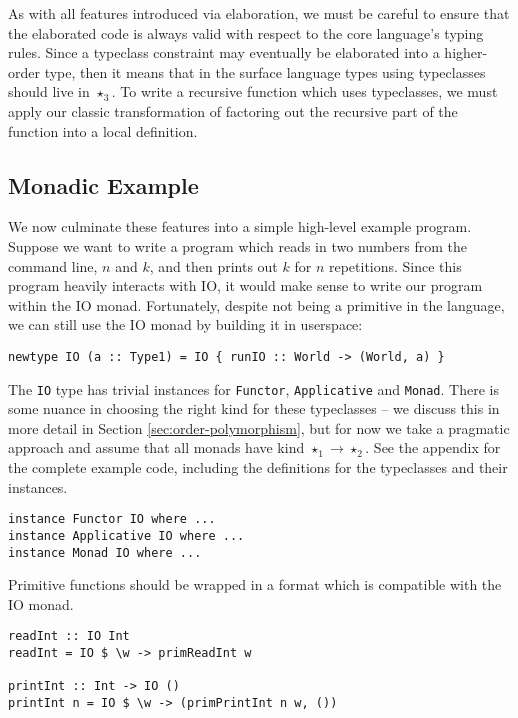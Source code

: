 \documentclass[runningheads]{llncs}
\begin{document}
As with all features introduced via elaboration, we must be careful to ensure that the elaborated code is always valid with respect to the core language's typing rules. Since a typeclass constraint may eventually be elaborated into a higher-order type, then it means that in the surface language types using typeclasses should live in $\star_3$. To write a recursive function which uses typeclasses, we must apply our classic transformation of factoring out the recursive part of the function into a local definition.



\subsection{Monadic Example} \label{sec:example}

We now culminate these features into a simple high-level example program. Suppose we want to write a program which reads in two numbers from the command line, $n$ and $k$, and then prints out $k$ for $n$ repetitions. Since this program heavily interacts with IO, it would make sense to write our program within the IO monad. Fortunately, despite not being a primitive in the language, we can still use the IO monad by building it in userspace:

\begin{verbatim}
newtype IO (a :: Type1) = IO { runIO :: World -> (World, a) }
\end{verbatim}

The \texttt{IO} type has trivial instances for \texttt{Functor}, \texttt{Applicative} and \texttt{Monad}. There is some nuance in choosing the right kind for these typeclasses -- we discuss this in more detail in Section \ref{sec:order-polymorphism}, but for now we take a pragmatic approach and assume that all monads have kind $\star_1 \rightarrow \star_2$. See the appendix for the complete example code, including the definitions for the typeclasses and their instances.

\begin{verbatim}
instance Functor IO where ...
instance Applicative IO where ...
instance Monad IO where ...
\end{verbatim}

Primitive functions should be wrapped in a format which is compatible with the IO monad.

\begin{verbatim}
readInt :: IO Int
readInt = IO $ \w -> primReadInt w

printInt :: Int -> IO ()
printInt n = IO $ \w -> (primPrintInt n w, ())
\end{verbatim}
\end{document}
